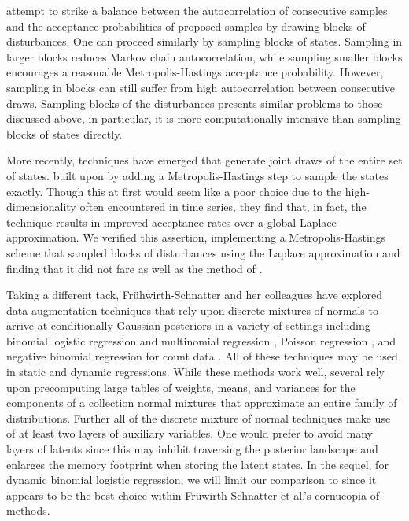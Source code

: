 \documentclass[12pt]{article}
\begin{document}
\cite{shephard-pitt-1997} attempt to strike a balance between the
autocorrelation of consecutive samples and the acceptance probabilities of
proposed samples by drawing blocks of disturbances.  One can proceed similarly
by sampling blocks of states.  Sampling in larger blocks reduces Markov chain
autocorrelation, while sampling smaller blocks encourages a reasonable
Metropolis-Hastings acceptance probability.  However, sampling in blocks can
still suffer from high autocorrelation between consecutive draws.  Sampling
blocks of the disturbances presents similar problems to those discussed above,
in particular, it is more computationally intensive than sampling blocks of
states directly.

More recently, techniques have emerged that generate joint draws of the entire
set of states.  \cite{ravines-etal-2006} built upon \cite{west-etal-1985} by
adding a Metropolis-Hastings step to sample the states exactly.  Though this at
first would seem like a poor choice due to the high-dimensionality often
encountered in time series, they find that, in fact, the technique results in
improved acceptance rates over a global Laplace approximation.  We verified this
assertion, implementing a Metropolis-Hastings scheme that sampled blocks of
disturbances using the Laplace approximation and finding that it did not fare as
well as the method of \cite{ravines-etal-2006}.

Taking a different tack, Fr\"{u}hwirth-Schnatter and her colleagues have
explored data augmentation techniques that rely upon discrete mixtures of
normals to arrive at conditionally Gaussian posteriors in a variety of settings
including binomial logistic regression and multinomial regression
\citep{fruhwirth-schnatter-fruhwirth-2007, fruhwirth-schnatter-fruhwirth-2010,
  fussl-etal-2013}, Poisson regression \citep{fruhwirth-schnatter-wagner-2006,
  fruhwirth-schnatter-etal-2009}, and negative binomial regression for count
data \citep{fruhwirth-schnatter-etal-2009}.  All of these techniques may be used
in static and dynamic regressions.  While these methods work well, several rely
upon precomputing large tables of weights, means, and variances for the
components of a collection normal mixtures that approximate an entire family of
distributions.  Further all of the discrete mixture of normal techniques make
use of at least two layers of auxiliary variables.  One would prefer to avoid
many layers of latents since this may inhibit traversing the posterior landscape
and enlarges the memory footprint when storing the latent states. In the sequel,
for dynamic binomial logistic regression, we will limit our comparison to
\cite{fussl-etal-2013} since it appears to be the best choice within
Fr\"{u}wirth-Schnatter et al.'s cornucopia of methods.
\end{document}
